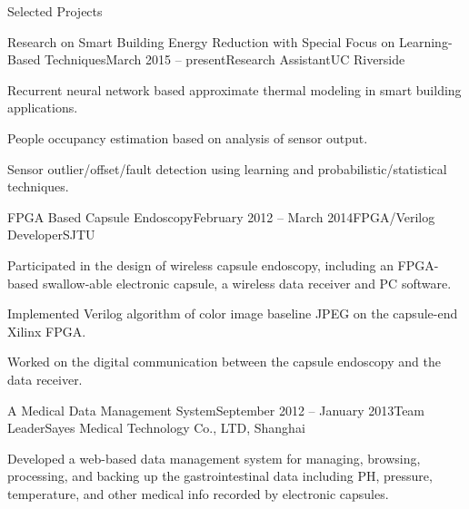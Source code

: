 \documentclass{resume} %
\begin{document}
\begin{rSection}{Selected Projects}


    \begin{rSubsection}{Research on Smart Building Energy Reduction with Special Focus on Learning-Based Techniques}{March 2015 -- present}{Research Assistant}{UC Riverside}

    \item Recurrent neural network based approximate thermal modeling in smart
        building applications.

    \item People occupancy estimation based on analysis of sensor output.

    \item Sensor outlier/offset/fault detection using learning and
        probabilistic/statistical techniques.

    \end{rSubsection}

    \begin{rSubsection}{FPGA Based Capsule Endoscopy}{February 2012 -- March 2014}{FPGA/Verilog Developer}{SJTU}

    \item Participated in the design of wireless capsule endoscopy, including an
        FPGA-based swallow-able electronic capsule, a wireless data receiver and PC
        software.

    \item Implemented Verilog algorithm of color image baseline JPEG on the
        capsule-end Xilinx FPGA.

    \item Worked on the digital communication between the capsule endoscopy and
        the data receiver.

    \end{rSubsection}

    \begin{rSubsection}{A Medical Data Management System}{September 2012 -- January 2013}{Team Leader}{Sayes Medical Technology Co., LTD, Shanghai}

    \item Developed a web-based data management system for managing, browsing,
        processing, and backing up the gastrointestinal data including PH,
        pressure, temperature, and other medical info recorded by electronic
        capsules.

    \end{rSubsection}


\end{rSection}
\end{document}
